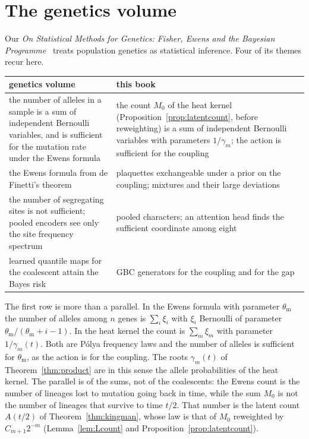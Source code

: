 \section{The genetics volume}

Our \emph{On Statistical Methods for Genetics: Fisher, Ewens and the Bayesian Programme}~\cite{Po26g} treats population genetics as statistical inference. Four of its themes recur here.

\begin{center}
\small
\begin{tabular}{p{}p{}}
\toprule
genetics volume & this book \\ \midrule
the number of alleles in a sample is a sum of independent Bernoulli variables, and is sufficient for the mutation rate under the Ewens formula & the count $M_0$ of the heat kernel (Proposition~\ref{prop:latentcount}, before reweighting) is a sum of independent Bernoulli variables with parameters $1/\gamma_m$; the action is sufficient for the coupling \\
the Ewens formula from de Finetti's theorem & plaquettes exchangeable under a prior on the coupling; mixtures and their large deviations \\
the number of segregating sites is not sufficient; pooled encoders see only the site frequency spectrum & pooled characters; an attention head finds the sufficient coordinate among eight \\
learned quantile maps for the coalescent attain the Bayes risk & GBC generators for the coupling and for the gap \\
\bottomrule
\end{tabular}
\end{center}

The first row is more than a parallel. In the Ewens formula with parameter $\theta_{\mathrm m}$ the number of alleles among $n$ genes is $\sum_i\xi_i$ with $\xi_i$ Bernoulli of parameter $\theta_{\mathrm m}/(\theta_{\mathrm m}+i-1)$. In the heat kernel the count is $\sum_m\xi_m$ with parameter $1/\gamma_m(t)$. Both are P\'olya frequency laws and the number of alleles is sufficient for $\theta_{\mathrm m}$, as the action is for the coupling. The roots $\gamma_m(t)$ of Theorem~\ref{thm:product} are in this sense the allele probabilities of the heat kernel. The parallel is of the sums, not of the coalescents: the Ewens count is the number of lineages lost to mutation going back in time, while the sum $M_0$ is not the number of lineages that survive to time $t/2$. That number is the latent count $A(t/2)$ of Theorem~\ref{thm:kingman}, whose law is that of $M_0$ reweighted by $C_{m+1}2^{-m}$ (Lemma~\ref{lem:Lcount} and Proposition~\ref{prop:latentcount}).

